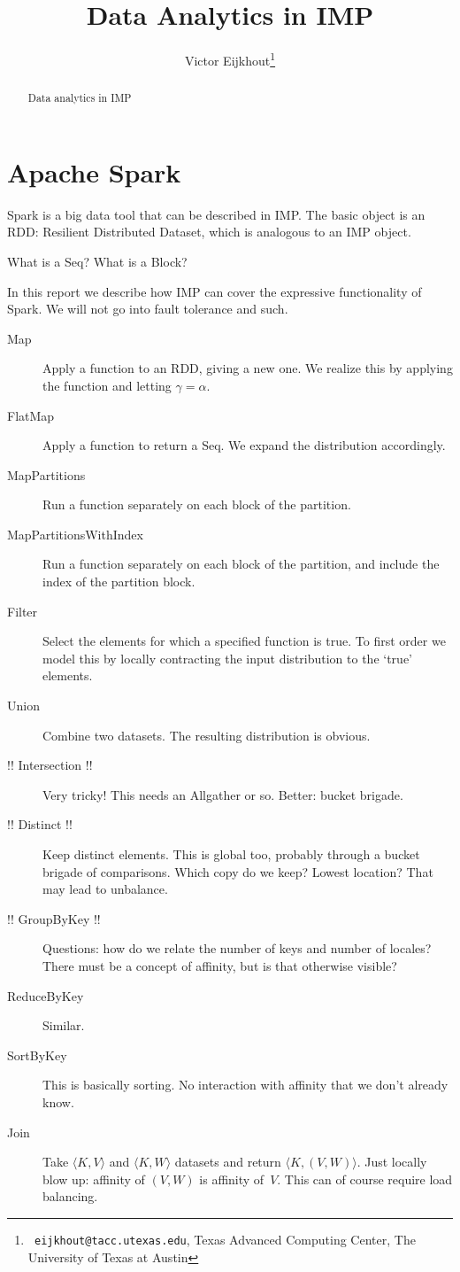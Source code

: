 \documentclass[11pt,fleqn,preprint]{impreport}
\title[Data analytics]{Data Analytics in IMP}
\author[Eijkhout]{Victor Eijkhout\thanks{{\tt
      eijkhout@tacc.utexas.edu}, Texas Advanced Computing
    Center, The University of Texas at Austin}}
\begin{document}
\maketitle

\begin{abstract}
  Data analytics in IMP
\end{abstract}

\acresetall

\section{Apache Spark}

Spark is a big data tool that can be described in IMP.
The basic object is an RDD: Resilient Distributed Dataset, which is
analogous to an IMP object.

What is a Seq? What is a Block?

In this report we describe how IMP can cover the expressive
functionality of Spark. We will not go into fault tolerance and such.

\begin{description}
\item[Map] Apply a function to an RDD, giving a new one. We realize
  this by applying the function and letting $\gamma=\alpha$.
\item[FlatMap] Apply a function to return a Seq. We expand the
  distribution accordingly.
\item[MapPartitions] Run a function separately on each block of the partition.
\item[MapPartitionsWithIndex] Run a function separately on each block
  of the partition, and include the index of the partition block.
\item[Filter] Select the elements for which a specified function is
  true. To first order we model this by locally contracting the input
  distribution to the `true' elements.
\item[Union] Combine two datasets. The resulting distribution is
  obvious.
\item[!! Intersection !!] Very tricky! This needs an Allgather or
  so. Better: bucket brigade.
\item[!! Distinct !!] Keep distinct elements. This is global too,
  probably through a bucket brigade of comparisons. Which copy do we
  keep? Lowest location? That may lead to unbalance.
\item[!! GroupByKey !!] Questions: how do we relate the number of keys and
  number of locales? There must be a concept of affinity, but is that
  otherwise visible?
\item[ReduceByKey] Similar.
\item[SortByKey] This is basically sorting. No interaction with
  affinity that we don't already know.
\item[Join] Take $\langle K,V\rangle$ and $\langle K,W\rangle$
  datasets and return $\langle K,(V,W)\rangle$. Just locally blow up:
  affinity of $(V,W)$ is affinity of~$V$. This can of course require
  load balancing.
\end{description}
\end{document}
